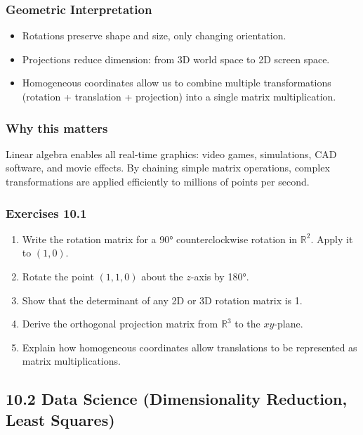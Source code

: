 \documentclass[
  12pt,
  a4paper,
]{article}
\begin{document}
\subsubsection{Geometric
Interpretation}\label{geometric-interpretation-23}

\begin{itemize}
\item
  Rotations preserve shape and size, only changing orientation.
\item
  Projections reduce dimension: from 3D world space to 2D screen space.
\item
  Homogeneous coordinates allow us to combine multiple transformations
  (rotation + translation + projection) into a single matrix
  multiplication.
\end{itemize}

\subsubsection{Why this matters}\label{why-this-matters-36}

Linear algebra enables all real-time graphics: video games, simulations,
CAD software, and movie effects. By chaining simple matrix operations,
complex transformations are applied efficiently to millions of points
per second.

\subsubsection{Exercises 10.1}\label{exercises-101}

\begin{enumerate}
\def\labelenumi{\arabic{enumi}.}
\item
  Write the rotation matrix for a 90° counterclockwise rotation in
  \(\mathbb{R}^2\). Apply it to \((1,0)\).
\item
  Rotate the point \((1,1,0)\) about the \(z\)-axis by 180°.
\item
  Show that the determinant of any 2D or 3D rotation matrix is 1.
\item
  Derive the orthogonal projection matrix from \(\mathbb{R}^3\) to the
  \(xy\)-plane.
\item
  Explain how homogeneous coordinates allow translations to be
  represented as matrix multiplications.
\end{enumerate}

\subsection{10.2 Data Science (Dimensionality Reduction, Least
Squares)}\label{102-data-science-dimensionality-reduction-least-squares}
\end{document}
